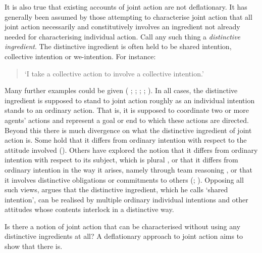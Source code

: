 \documentclass[12pt,a4paper]{extarticle}
\begin{document}
It is also true that existing accounts of joint action are not deflationary.
It has generally been assumed by those attempting to characterise joint action that all joint action necessarily and constitutively involves an ingredient not already needed for characterising individual action.
{Call any such thing a \emph{distinctive ingredient}.
\label{df_distinctive_ingredient}}
The distinctive ingredient is often held to be shared intention, collective intention or we-intention.
For instance:  
%
\begin{quote} 
`I take a collective action to involve a collective intention.'  \citep[p.\ 5]{Gilbert:2006wr}
\end{quote}
%
Many further examples could be given  (%
	\citealp[p.\ 381]{Carpenter:2009wq}; 
	\citealp[p.\ 369]{Call:2009fk};
	\citealp{Kutz:2000si}; 
	\citealp[p.\ 117]{rakoczy_pretend_2006}; 
	\citealp{Tollefsen:2005vh}%
	).
In all cases, the distinctive ingredient is supposed to stand to joint action roughly as an individual intention stands to an ordinary action.
That is, it is supposed to coordinate two or more agents' actions and represent a goal or end to which these actions are directed.
Beyond this there is much divergence on what the distinctive ingredient of joint action is.
Some hold that it differs from
ordinary intention with respect to the attitude involved (\citealp{Searle:1990em}). 
Others have explored the notion that it differs from ordinary intention with respect to its subject, which is plural \citep{Gilbert:1992rs,helm_plural_2008}, 
or that it differs from ordinary intention in the way it arises, namely through team reasoning \citep{Gold:2007zd}, 
or that it involves distinctive obligations or commitments to others (\citealp{Gilbert:1992rs}; \citealp{Roth:2004ki}).
Opposing all such views, \citet{Bratman:1992mi,Bratman:2009lv} argues that the distinctive ingredient, which he calls `shared intention', can be realised by multiple ordinary individual intentions and other attitudes whose contents interlock in a distinctive way. 

Is there a notion of joint action that can be characterised without using any distinctive ingredients at all?  
A deflationary approach to joint action aims to show that there is.
\end{document}
